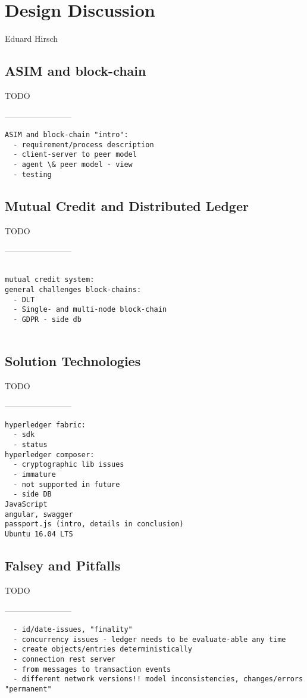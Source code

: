 \chapter{Design Discussion}
\label{ch:design}

\vspace{-1cm}
\begin{center}
Eduard Hirsch
\end{center}

\section{ASIM and block-chain}
\label{sec:asim}

TODO

------------------------

\begin{verbatim}
ASIM and block-chain "intro":
  - requirement/process description
  - client-server to peer model
  - agent \& peer model - view 
  - testing
\end{verbatim}

\section{Mutual Credit and Distributed Ledger}
\label{sec:dlt} 

TODO

------------------------

\begin{verbatim}

mutual credit system:
general challenges block-chains:
  - DLT
  - Single- and multi-node block-chain
  - GDPR - side db
  
\end{verbatim}
  
\section{Solution Technologies}
\label{sec:solution}

TODO

------------------------

\begin{verbatim}
hyperledger fabric:
  - sdk
  - status
hyperledger composer:
  - cryptographic lib issues
  - immature
  - not supported in future
  - side DB
JavaScript
angular, swagger
passport.js (intro, details in conclusion)
Ubuntu 16.04 LTS
\end{verbatim}

\section{Falsey and Pitfalls}

TODO

------------------------

\begin{verbatim}
  - id/date-issues, "finality"
  - concurrency issues - ledger needs to be evaluate-able any time
  - create objects/entries deterministically
  - connection rest server
  - from messages to transaction events
  - different network versions!! model inconsistencies, changes/errors "permanent"
\end{verbatim}